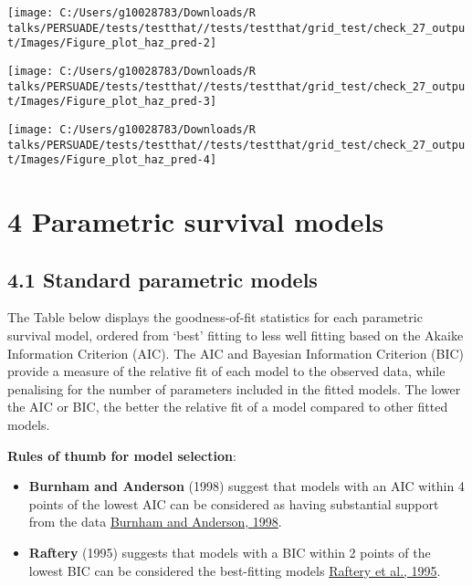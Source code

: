 \documentclass[
]{article}
\providecommand{\tightlist}{%
  \setlength{\itemsep}{0pt}\setlength{\parskip}{0pt}}
\begin{document}
\begin{flushleft}\texttt{[image: C:/Users/g10028783/Downloads/R talks/PERSUADE/tests/testthat//tests/testthat/grid\_test/check\_27\_output/Images/Figure\_plot\_haz\_pred-2]} \end{flushleft}

\begin{flushleft}\texttt{[image: C:/Users/g10028783/Downloads/R talks/PERSUADE/tests/testthat//tests/testthat/grid\_test/check\_27\_output/Images/Figure\_plot\_haz\_pred-3]} \end{flushleft}

\begin{flushleft}\texttt{[image: C:/Users/g10028783/Downloads/R talks/PERSUADE/tests/testthat//tests/testthat/grid\_test/check\_27\_output/Images/Figure\_plot\_haz\_pred-4]} \end{flushleft}

\clearpage

\section{4 Parametric survival models}\label{parametric-survival-models}

\subsection{4.1 Standard parametric
models}\label{standard-parametric-models}

The Table below displays the goodness-of-fit statistics for each
parametric survival model, ordered from `best' fitting to less well
fitting based on the Akaike Information Criterion (AIC). The AIC and
Bayesian Information Criterion (BIC) provide a measure of the relative
fit of each model to the observed data, while penalising for the number
of parameters included in the fitted models. The lower the AIC or BIC,
the better the relative fit of a model compared to other fitted models.

\textbf{Rules of thumb for model selection}:

\begin{itemize}
\tightlist
\item
  \textbf{Burnham and Anderson} (1998) suggest that models with an AIC
  within 4 points of the lowest AIC can be considered as having
  substantial support from the data
  \href{https://doi.org/10.1007/978-1-4757-2917-7}{Burnham and Anderson,
  1998}.\\
\item
  \textbf{Raftery} (1995) suggests that models with a BIC within 2
  points of the lowest BIC can be considered the best-fitting models
  \href{https://doi.org/10.2307/271063}{Raftery et al., 1995}.
\end{itemize}
\end{document}
